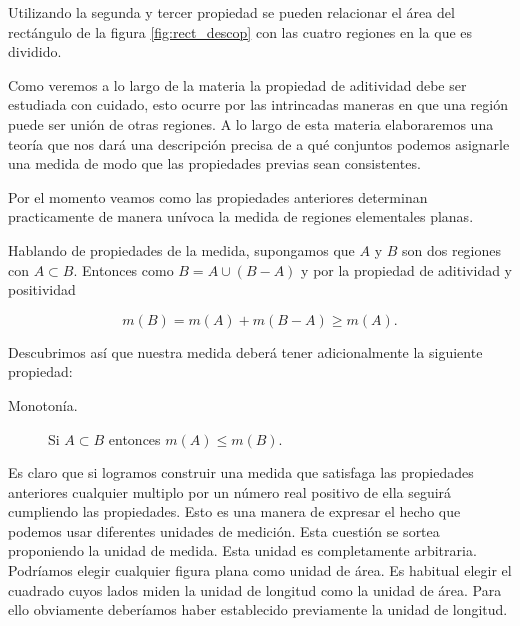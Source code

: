 Utilizando la segunda y tercer propiedad se pueden relacionar el área del rectángulo de la figura \ref{fig:rect_descop} con las cuatro regiones en la que es dividido.

Como veremos a lo largo de la materia la propiedad de aditividad debe ser estudiada con cuidado, esto ocurre por las intrincadas maneras en que una región puede ser unión de otras regiones. A lo largo de esta materia elaboraremos una  teoría que nos dará una descripción  precisa de a qué conjuntos podemos asignarle una medida de modo que las propiedades previas sean consistentes. 

Por el momento veamos como las propiedades anteriores determinan practicamente de manera unívoca la medida de regiones elementales planas.  


Hablando de propiedades de la medida, supongamos que $A$ y $B$ son dos regiones con $A\subset B$. Entonces como $B=A\cup (B-A)$ y por la propiedad de aditividad y positividad

\[
 m(B)=m(A)+m(B-A)\geq m(A).
\]

Descubrimos así que nuestra medida deberá tener adicionalmente la siguiente propiedad:
\begin{description}
 \item[Monotonía.] Si $A\subset B$ entonces $m(A)\leq m(B)$. 
\end{description}
Es claro que si logramos construir una medida que satisfaga las propiedades anteriores cualquier multiplo por un número real positivo  de ella seguirá cumpliendo las propiedades. Esto es una manera de expresar el hecho que podemos usar diferentes unidades de medición. Esta cuestión se sortea proponiendo la unidad de medida. Esta unidad es completamente arbitraria. Podríamos elegir cualquier figura plana   como unidad de área.   Es habitual elegir el cuadrado cuyos lados miden la unidad de longitud como la unidad de área. Para ello obviamente deberíamos haber establecido previamente la unidad de longitud. 


